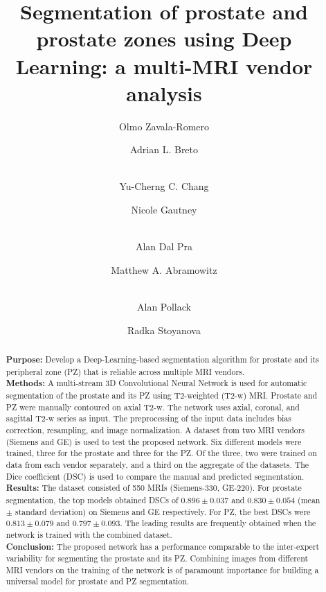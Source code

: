 \documentclass[num-refs]{wiley-article}
\title{ Segmentation of prostate and prostate zones using Deep Learning: a multi-MRI vendor analysis}
\author[1]{Olmo Zavala-Romero}
\author[1]{Adrian L. Breto}
\author[2]{\\Yu-Cherng C. Chang}
\author[1]{Nicole Gautney}
\author[1]{\\Alan Dal Pra}
\author[1]{Matthew A. Abramowitz}
\author[1]{\\Alan Pollack}
\author[1]{Radka Stoyanova}
\affil[1]{Department of Radiation Oncology, University of Miami Miller School of Medicine,
                Miami, FL, 33136, USA}
\affil[2]{University of Miami Miller School of Medicine,
                Miami, FL, 33136, USA}
\begin{document}
\maketitle

\begin{abstract} %
\textbf{Purpose:} Develop a Deep-Learning-based segmentation algorithm for prostate and its peripheral zone (PZ) that is reliable across multiple MRI vendors. \\
\textbf{Methods:} A multi-stream 3D Convolutional Neural Network is used for automatic segmentation of the prostate and its PZ using T2-weighted (T2-w) MRI. Prostate and PZ were manually contoured on axial T2-w. The network uses axial, coronal, and sagittal T2-w series as input. The preprocessing of the input data includes bias correction, resampling, and image normalization. A dataset from two MRI vendors (Siemens and GE) is used to test the proposed network. Six different models were trained, three for the prostate and three for the PZ. Of the three, two were trained on data from each vendor separately, and a third on the aggregate of the datasets. The Dice coefficient (DSC) is used to compare the manual and predicted segmentation. \\
\textbf{Results:} The dataset consisted of 550 MRIs (Siemens-330, GE-220). 
For prostate segmentation, the top models obtained DSCs of $0.896 \pm 0.037$ and  $0.830 \pm 0.054$ (mean $\pm$ standard deviation) on Siemens and GE respectively. For PZ, the best DSCs were $0.813 \pm 0.079$ and $0.797 \pm 0.093$. The leading results are frequently obtained when the network is trained with the combined dataset. \\
\textbf{Conclusion:} The proposed network has a performance comparable to the inter-expert variability for segmenting the prostate and its PZ. Combining images from different MRI vendors on the training of the network is of paramount importance for building a universal model for prostate and PZ segmentation. 
\end{abstract}




\end{document}
